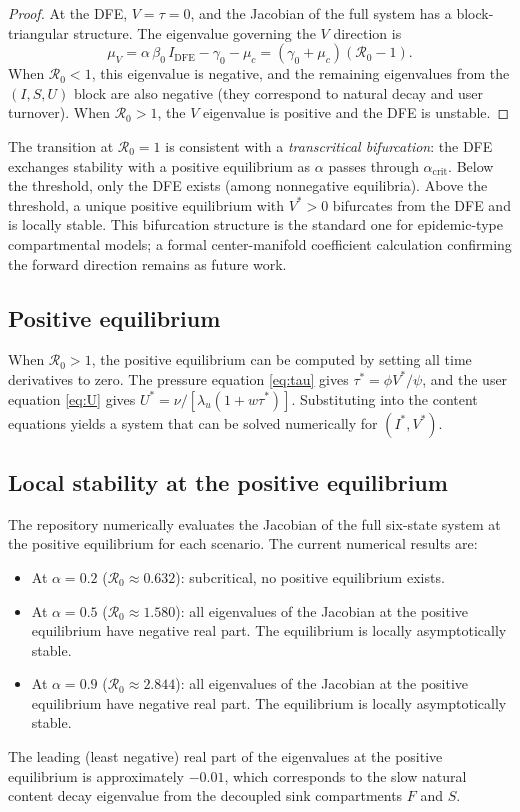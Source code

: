 \documentclass[11pt]{article}
\begin{document}
\begin{proof}
At the DFE, $V = \tau = 0$, and the Jacobian of the full system has a block-triangular structure. The eigenvalue governing the $V$ direction is
\[
\mu_V = \alpha\,\beta_0\,I_{\mathrm{DFE}} - \gamma_0 - \mu_c = (\gamma_0 + \mu_c)(\mathcal{R}_0 - 1).
\]
When $\mathcal{R}_0 < 1$, this eigenvalue is negative, and the remaining eigenvalues from the $(I, S, U)$ block are also negative (they correspond to natural decay and user turnover). When $\mathcal{R}_0 > 1$, the $V$ eigenvalue is positive and the DFE is unstable.
\end{proof}

The transition at $\mathcal{R}_0 = 1$ is consistent with a \emph{transcritical bifurcation}: the DFE exchanges stability with a positive equilibrium as $\alpha$ passes through $\alpha_{\mathrm{crit}}$. Below the threshold, only the DFE exists (among nonnegative equilibria). Above the threshold, a unique positive equilibrium with $V^* > 0$ bifurcates from the DFE and is locally stable. This bifurcation structure is the standard one for epidemic-type compartmental models; a formal center-manifold coefficient calculation confirming the forward direction remains as future work.

\subsection{Positive equilibrium}

When $\mathcal{R}_0 > 1$, the positive equilibrium can be computed by setting all time derivatives to zero. The pressure equation \eqref{eq:tau} gives $\tau^* = \phi V^* / \psi$, and the user equation \eqref{eq:U} gives $U^* = \nu / [\lambda_u(1 + w\tau^*)]$. Substituting into the content equations yields a system that can be solved numerically for $(I^*, V^*)$.

\subsection{Local stability at the positive equilibrium}

The repository numerically evaluates the Jacobian of the full six-state system at the positive equilibrium for each scenario. The current numerical results are:
\begin{itemize}[leftmargin=1.5em]
    \item At $\alpha = 0.2$ ($\mathcal{R}_0 \approx 0.632$): subcritical, no positive equilibrium exists.
    \item At $\alpha = 0.5$ ($\mathcal{R}_0 \approx 1.580$): all eigenvalues of the Jacobian at the positive equilibrium have negative real part. The equilibrium is locally asymptotically stable.
    \item At $\alpha = 0.9$ ($\mathcal{R}_0 \approx 2.844$): all eigenvalues of the Jacobian at the positive equilibrium have negative real part. The equilibrium is locally asymptotically stable.
\end{itemize}
The leading (least negative) real part of the eigenvalues at the positive equilibrium is approximately $-0.01$, which corresponds to the slow natural content decay eigenvalue from the decoupled sink compartments $F$ and $S$.
\end{document}
